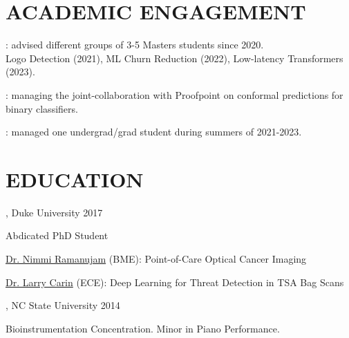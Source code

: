 \documentclass[resmargin]{resume_style_class} %
\newenvironment{outline}
  {\begin{list}{}{\setlength{\leftmargin}{30pt}\setlength\itemsep{-2pt}}}
  {\end{list}}
\newenvironment{outline-cond}
  {\begin{list}{}{
  \setlength{\leftmargin}{30pt}
  \setlength\topsep{-10pt}
  \setlength\itemindent{-30pt}
  }}
  {\end{list}}
\begin{document}
\begin{resume}
\section{ACADEMIC ENGAGEMENT}
\begin{outline-cond} 
	\item {}: advised different groups of 3-5 Masters students since 2020. \\Logo Detection (2021), ML Churn Reduction (2022), Low-latency Transformers (2023).
	\item {}: managing the joint-collaboration with Proofpoint on conformal predictions for binary classifiers.
	\item {}: managed one undergrad/grad student during summers of 2021-2023.
\end{outline-cond} 





\section{EDUCATION}

, Duke University \hfill 2017
\begin{outline}
	\item Abdicated PhD Student
	\item \href{https://bme.duke.edu/faculty/nimmi-ramanujam}{Dr. Nimmi Ramanujam} (BME): Point-of-Care Optical Cancer Imaging
	\item \href{https://scholar.google.com/citations?user=ZhGL6WcAAAAJ&hl=en}{Dr. Larry Carin} (ECE): Deep Learning for Threat Detection in TSA Bag Scans
\end{outline}

, NC State University \hfill 2014
\begin{outline}
	\item Bioinstrumentation Concentration. Minor in Piano Performance.
\end{outline}


\end{resume}
\end{document}
